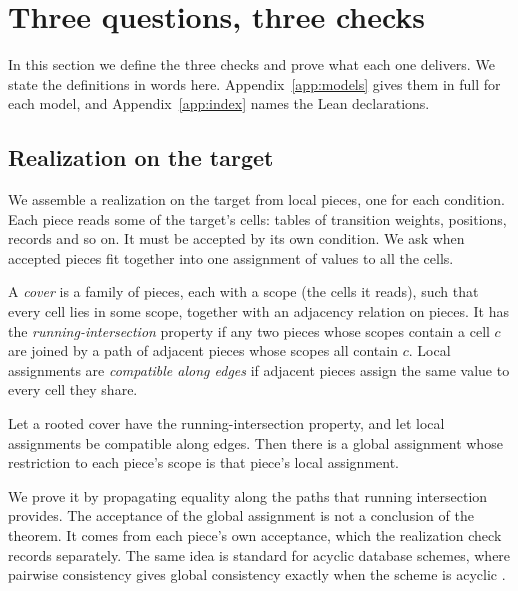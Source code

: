 \section{Three questions, three checks}
\label{sec:checks}

In this section we define the three checks and prove what each one delivers.
We state the definitions in words here. Appendix~\ref{app:models} gives them in
full for each model, and Appendix~\ref{app:index} names the Lean declarations.

\subsection{Realization on the target}
\label{sec:realization}

We assemble a realization on the target from local pieces, one for each
condition. Each piece reads some of the target's cells: tables of transition
weights, positions, records and so on. It must be accepted by its own
condition. We ask when accepted pieces fit together into one assignment of values to all
the cells.

\begin{definition}
\label{def:cover}
A \emph{cover} is a family of pieces, each with a scope (the cells it reads),
such that every cell lies in some scope, together with an adjacency relation
on pieces. It has the \emph{running-intersection} property if any two pieces
whose scopes contain a cell $c$ are joined by a path of adjacent pieces whose
scopes all contain $c$. Local assignments are \emph{compatible along edges} if
adjacent pieces assign the same value to every cell they share.
\end{definition}

\begin{theorem}[Gluing]
\label{thm:gluing}
Let a rooted cover have the running-intersection property, and let local
assignments be compatible along edges. Then there is a global assignment whose
restriction to each piece's scope is that piece's local assignment.
\end{theorem}

We prove it by propagating equality along the paths that running intersection
provides. The acceptance of the global assignment is not a conclusion of the
theorem. It comes from each piece's own acceptance, which the realization
check records separately. The same idea is standard for acyclic database
schemes, where pairwise consistency gives global consistency exactly when the
scheme is acyclic \citep[Theorem~3.4]{BeeriEtAl1983}.

